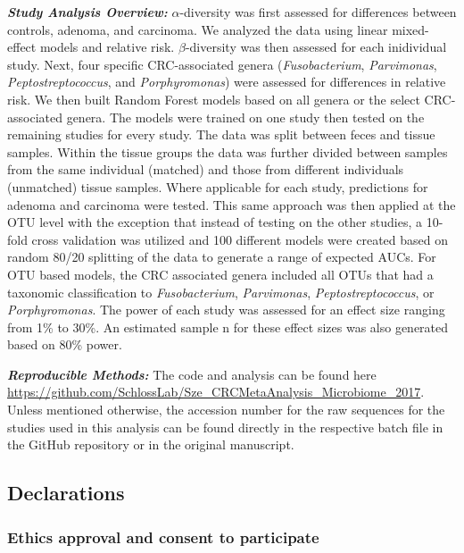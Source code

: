 \documentclass[12pt,]{article}
\begin{document}
\textbf{\emph{Study Analysis Overview:}} \(\alpha\)-diversity was first
assessed for differences between controls, adenoma, and carcinoma. We
analyzed the data using linear mixed-effect models and relative risk.
\(\beta\)-diversity was then assessed for each inidividual study. Next,
four specific CRC-associated genera (\emph{Fusobacterium},
\emph{Parvimonas}, \emph{Peptostreptococcus}, and \emph{Porphyromonas})
were assessed for differences in relative risk. We then built Random
Forest models based on all genera or the select CRC-associated genera.
The models were trained on one study then tested on the remaining
studies for every study. The data was split between feces and tissue
samples. Within the tissue groups the data was further divided between
samples from the same individual (matched) and those from different
individuals (unmatched) tissue samples. Where applicable for each study,
predictions for adenoma and carcinoma were tested. This same approach
was then applied at the OTU level with the exception that instead of
testing on the other studies, a 10-fold cross validation was utilized
and 100 different models were created based on random 80/20 splitting of
the data to generate a range of expected AUCs. For OTU based models, the
CRC associated genera included all OTUs that had a taxonomic
classification to \emph{Fusobacterium}, \emph{Parvimonas},
\emph{Peptostreptococcus}, or \emph{Porphyromonas}. The power of each
study was assessed for an effect size ranging from 1\% to 30\%. An
estimated sample n for these effect sizes was also generated based on
80\% power.

\textbf{\emph{Reproducible Methods:}} The code and analysis can be found
here
\url{https://github.com/SchlossLab/Sze_CRCMetaAnalysis_Microbiome_2017}.
Unless mentioned otherwise, the accession number for the raw sequences
for the studies used in this analysis can be found directly in the
respective batch file in the GitHub repository or in the original
manuscript.

\newpage

\subsection{Declarations}\label{declarations}

\subsubsection{Ethics approval and consent to
participate}\label{ethics-approval-and-consent-to-participate}
\end{document}
